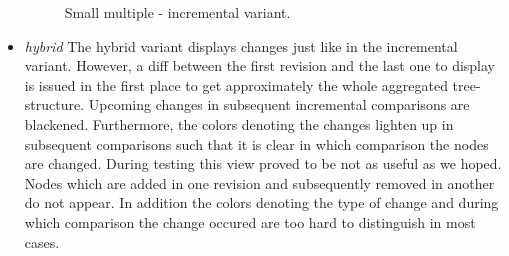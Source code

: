 \begin{itemize}
\begin{figure}[tb]
\caption{\label{fig:smallmultiple-incremental} Small multiple - incremental variant.}
\end{figure}

\item \emph{hybrid} The hybrid variant displays changes just like in the incremental variant. However, a diff between the first revision and the last one to display is issued in the first place to get approximately the whole aggregated tree-structure. Upcoming changes in subsequent incremental comparisons are blackened. Furthermore, the colors denoting the changes lighten up in subsequent comparisons such that it is clear in which comparison the nodes are changed. During testing this view proved to be not as useful as we hoped. Nodes which are added in one revision and subsequently removed in another do not appear. In addition the colors denoting the type of change and during which comparison the change occured are too hard to distinguish in most cases.


\end{itemize}
